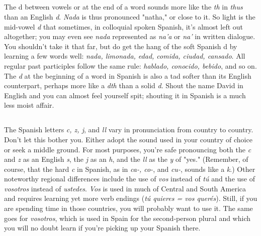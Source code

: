 \documentclass[14pt,a4paper,oneside]{memoir}
\begin{document}
\subsection{}

The d between vowels or at the end of a word sounds more
like the \emph{th} in \emph{thus} than an English \emph{d}. \emph{Nada} is thus pronounced "natha," or close to it. So light is the mid-vowel \emph{d} that sometimes, in colloquial spoken Spanish, it's almost left out altogether; you may even
see \emph{nada} represented as \emph{na'a} or \emph{na'} in written dialogue. You shouldn't
take it that far, but do get the hang of the soft Spanish d by learning a
few words well: \emph{nada, limonada, edad, comida, ciudad, cansado}. All
regular past participles follow the same rule: \emph{hablado, conocido, bebido}, and so on. The \emph{d} at the beginning of a word in Spanish is also a
tad softer than its English counterpart, perhaps more like a \emph{dth} than a
solid \emph{d}. Shout the name David in English and you can almost feel
yourself spit; shouting it in Spanish is a much less moist affair.

\subsection{}

The Spanish letters \emph{c, z, j}, and \emph{ll} vary in pronunciation
from country to country. Don't let this bother you. Either adopt the
sound used in your country of choice or seek a middle ground. For
most purposes, you're safe pronouncing both the \emph{c} and \emph{z} as an English
\emph{s}, the \emph{j} as an \emph{h}, and the \emph{ll} as the \emph{y} of "yes." (Remember, of course, that
the hard \emph{c} in Spanish, as in \emph{ca-, co-}, and \emph{cu-}, sounds like a \emph{k}.) Other
noteworthy regional differences include the use of \emph{vos} instead of \emph{tú}
and the use of \emph{vosotros} instead of \emph{ustedes}. \emph{Vos} is used in much of
Central and South America and requires learning yet more verb endings (\emph{tú quieres = vos querés}). Still, if you are spending time in those
countries, you will probably want to use it. The same goes for \emph{vosotros}, which is used in Spain for the second-person plural and which
you will no doubt learn if you're picking up your Spanish there.

\subsection{}
\end{document}
